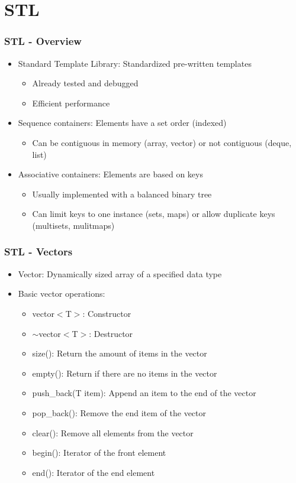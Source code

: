 \section{STL}
\begin{frame}\frametitle{STL - Overview}
\begin{itemize}
\item Standard Template Library: Standardized pre-written templates
	\begin{itemize}
	\item Already tested and debugged
	\item Efficient performance
	\end{itemize}
\item Sequence containers: Elements have a set order (indexed)
	\begin{itemize}
	\item Can be contiguous in memory (array, vector) or not contiguous (deque, list)
	\end{itemize}
\item Associative containers: Elements are based on keys
	\begin{itemize}
	\item Usually implemented with a balanced binary tree
	\item Can limit keys to one instance (sets, maps) or allow duplicate keys (multisets, mulitmaps)
	\end{itemize}
\end{itemize}
\end{frame}

\begin{frame}\frametitle{STL - Vectors}
\begin{itemize}
\item Vector: Dynamically sized array of a specified data type
\item Basic vector operations:
	\begin{itemize}
	\item vector$<$T$>$: Constructor
	\item $\sim$vector$<$T$>$: Destructor
	\item size(): Return the amount of items in the vector
	\item empty(): Return if there are no items in the vector
	\item push\_back(T item): Append an item to the end of the vector
	\item pop\_back(): Remove the end item of the vector
	\item clear(): Remove all elements from the vector
	\item begin(): Iterator of the front element
	\item end(): Iterator of the end element
	\end{itemize}
\end{itemize}
\end{frame}

